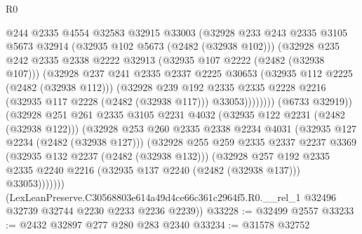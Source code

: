 \begin{lexlean}{R0}
\begin{coremodule}
                      @244
                      @2335
                      @4554
                      @32583
                      @32915
                      @33003
                      (@32928
                        @233
                        @243
                        @2335
                        @3105
                        @5673
                        @32914
                        (@32935 @102 @5673 (@2482 (@32938 @102)))
                        (@32928
                          @235
                          @242
                          @2335
                          @2338
                          @2222
                          @32913
                          (@32935 @107 @2222 (@2482 (@32938 @107)))
                          (@32928
                            @237
                            @241
                            @2335
                            @2337
                            @2225
                            @30653
                            (@32935 @112 @2225 (@2482 (@32938 @112)))
                            (@32928
                              @239
                              @192
                              @2335
                              @2335
                              @2228
                              @2216
                              (@32935 @117 @2228 (@2482 (@32938 @117)))
                              @33053))))))))
              (@6733 @32919))
            (@32928
              @251
              @261
              @2335
              @3105
              @2231
              @4032
              (@32935 @122 @2231 (@2482 (@32938 @122)))
              (@32928
                @253
                @260
                @2335
                @2338
                @2234
                @4031
                (@32935 @127 @2234 (@2482 (@32938 @127)))
                (@32928
                  @255
                  @259
                  @2335
                  @2337
                  @2237
                  @3369
                  (@32935 @132 @2237 (@2482 (@32938 @132)))
                  (@32928
                    @257
                    @192
                    @2335
                    @2335
                    @2240
                    @2216
                    (@32935 @137 @2240 (@2482 (@32938 @137)))
                    @33053)))))))
      (LexLeanPreserve.C30568803e614a49d4ce66c361c2964f5.R0.__rel_1
        @32496
        @32739
        @32744
        @2230
        @2233
        @2236
        @2239))
@33228 := @32499 @2557
@33233 := @2432 @32897 @277 @280 @283 @2340
@33234 := @31578 @32752

\end{coremodule}
\end{lexlean}

